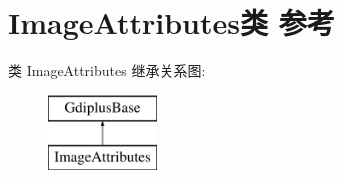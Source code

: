 \hypertarget{class_image_attributes}{}\section{Image\+Attributes类 参考}
\label{class_image_attributes}
类 Image\+Attributes 继承关系图\+:\begin{figure}[H]
\begin{center}
\leavevmode
\includegraphics[height=2.000000cm]{class_image_attributes}
\end{center}
\end{figure}
